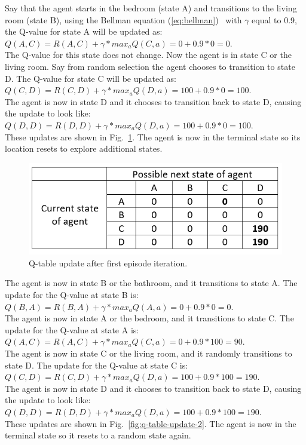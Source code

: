 \documentclass[12pt,american]{report}
\begin{document}
Say that the agent starts in the bedroom (state A) and transitions to the living room (state B), using the Bellman equation (\ref{eq:bellman})~\cite{matiisen_2015} with $\gamma$ equal to 0.9, the Q-value for state A will be updated as: \\
$Q(A,C) = R(A,C) + \gamma*max_a Q(C,a) = 0 + 0.9*0 = 0$. \\ 
The Q-value for this state does not change.  Now the agent is in state C or the living room.  Say from random selection the agent chooses to transition to state D. The Q-value for state C will be updated as: \\
$Q(C,D) = R(C,D) + \gamma*max_a Q(D,a) = 100 + 0.9*0 = 100$. \\
The agent is now in state D and it chooses to transition back to state D, causing the update to look like: \\
$Q(D,D) = R(D,D) + \gamma*max_a Q(D,a) = 100 + 0.9*0 = 100$. \\
These updates are shown in Fig.~\ref{fig:q-table-update-1}. The agent is now in the terminal state so its location resets to explore additional states.  
\begin{figure}
\centering
\includegraphics[scale=1.5]{images/q-table-update-1.png}
\caption{Q-table update after first episode iteration.}
\label{fig:q-table-update-1}
\end{figure}

The agent is now in state B or the bathroom, and it transitions to state A. The update for the Q-value at state B is: \\
$Q(B,A) = R(B,A) + \gamma*max_a Q(A,a) = 0 + 0.9*0 = 0$. \\
The agent is now in state A or the bedroom, and it transitions to state C. The update for the Q-value at state A is: \\
$Q(A,C) = R(A,C) + \gamma*max_a Q(C,a) = 0 + 0.9*100 = 90$. \\
The agent is now in state C or the living room, and it randomly transitions to state D. The update for the Q-value at state C is: \\
$Q(C,D) = R(C,D) + \gamma*max_a Q(D,a) = 100 + 0.9*100 = 190$.  \\
The agent is now in state D and it chooses to transition back to state D, causing the update to look like: \\
$Q(D,D) = R(D,D) + \gamma*max_a Q(D,a) = 100 + 0.9*100 = 190$. \\
These updates are shown in Fig.~\ref{fig:q-table-update-2}. The agent is now in the terminal state so it resets to a random state again. 
\end{document}
